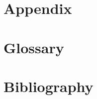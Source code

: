 \newpage


\section{Appendix}\label{sec:appendix}

\newpage


\section{Glossary}\label{sec:glossary}

\printglossary[type=\acronymtype]

\printglossary

\newpage


\section{Bibliography}\label{sec:bibliography}

\printbibliography[heading=bibnumbered, title={Bibliography}]